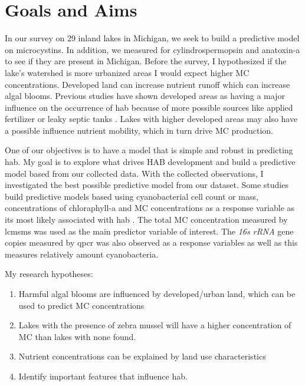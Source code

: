  \section{Goals and Aims}
In our survey on 29 inland lakes in Michigan, we seek to build a predictive model on microcystins. In addition, we  measured for cylindrospermopsin and anatoxin-a to see if they are present in Michigan. Before the survey, I hypothesized if the lake's watershed is more urbanized areas I would expect higher MC concentrations. Developed land can increase nutrient runoff which can increase algal blooms. Previous studies have shown developed areas as having a major influence on the occurrence of \gls{hab} because of more possible sources like applied fertilizer or leaky septic tanks \cite{beaver_land_2014, anderson_harmful_2002}. Lakes with higher developed areas may also have a possible influence nutrient mobility, which in turn drive MC production.

One of our objectives is to have a model that is simple and robust in predicting \gls{hab}.
My goal is to explore what drives HAB development and build a predictive model based from our collected data.  With the collected observations, I investigated the best possible predictive model from our dataset.
Some studies build predictive models based using cyanobacterial cell count or mass, concentrations of chloraphyll-a and MC concentrations as a response variable as its most likely associated with \gls{hab} \cite{moore_richard_cyanobacterial_1993, ahn_evaluation_2011, jiang_statistical_2008, beaulieu_nutrients_2013, taranu_predicting_2017}.
The total MC concentration measured by \gls{lcmsms} was used as the main predictor variable of interest. The \emph{16s rRNA} gene copies measured by \gls{qpcr} was also observed as a response variables as well as this measures relatively amount cyanobacteria.



My research hypotheses:

\begin{enumerate}
 \item Harmful algal blooms are influenced by  developed/urban land, which can be used to predict MC concentrations
 \item Lakes with the presence of zebra mussel will have a higher concentration of MC than lakes with none found.
 \item Nutrient concentrations can be explained by land use characteristics
 \item Identify important features that influence \gls{hab}.

\end{enumerate}
